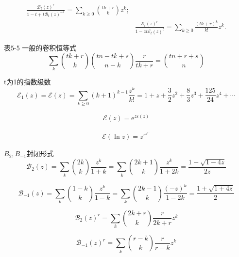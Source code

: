 \begin{equation}
    \begin{aligned}
    \frac{\mathcal{B}_{t}(z)^{r}}{1-t+t \mathcal{B}_{t}(z)^{-1}}=\sum_{k \geqslant 0}{t k+r \choose k} z^{k} ; \\
    & \frac{\mathcal{E}_{t}(z)^{r}}{1-z t \mathcal{E}_{t}(z)^{t}}=\sum_{k \geqslant 0} \frac{(t k+r)^{k}}{k !} z^{k} .
    \end{aligned}
\end{equation}

表5-5 一般的卷积恒等式
\setcounter{equation}{61}
\begin{equation}
    \sum_{k}{t k+r \choose k}{t n-t k+s \choose n-k} \frac{r}{t k+r}={t n+r+s \choose n}
\end{equation}

\setcounter{equation}{65}
t为1的指数级数
\begin{equation}
    \mathcal{E}_1(z) = \mathcal{E}(z)=\sum_{k \geqslant 0}(k+1)^{k-1} \frac{z^{k}}{k !}=1+z+\frac{3}{2} z^{2}+\frac{8}{3} z^{3}+\frac{125}{24} z^{4}+\cdots
\end{equation}

\begin{align}
    \mathcal{E}(z)=\mathrm{e}^{z \varepsilon(z)}
\end{align}

\begin{align*}
    \mathcal{E}(\ln z)= z^{z^{z^{z^{...}}}}
\end{align*}

$B_2, B_{-1}$封闭形式
\begin{equation}
    \mathcal{B}_{2}(z)=\sum_{k}{2 k \choose k} \frac{z^{k}}{1+k}=\sum_{k}{2 k+1 \choose k} \frac{z^{k}}{1+2 k}=\frac{1-\sqrt{1-4 z}}{2 z}
\end{equation}

\begin{equation}
    \mathcal{B}_{-1}(z)=\sum_{k}{1-k \choose k} \frac{z^{k}}{1-k}=\sum_{k}{2 k-1 \choose k} \frac{(-z)^{k}}{1-2 k}=\frac{1+\sqrt{1+4 z}}{2}
\end{equation}

\begin{equation}
    \mathcal{B}_{2}(z)^{r}=\sum_{k}{2 k+r \choose k} \frac{r}{2 k+r} z^{k}
\end{equation}

\begin{equation}
    \mathcal{B}_{-1}(z)^{r}=\sum_{k}{r-k \choose k} \frac{r}{r-k} z^{k}
\end{equation}

